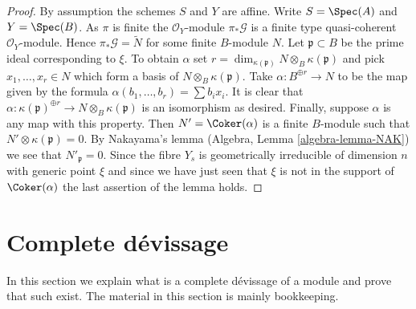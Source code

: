 \begin{proof}
By assumption the schemes $S$ and $Y$ are affine.
Write $S = \Spec(A)$ and $Y = \Spec(B)$.
As $\pi$ is finite the $\mathcal{O}_Y$-module $\pi_*\mathcal{G}$
is a finite type quasi-coherent $\mathcal{O}_Y$-module.
Hence $\pi_*\mathcal{G} = \widetilde{N}$ for some finite $B$-module $N$.
Let $\mathfrak p \subset B$ be the prime ideal corresponding to $\xi$.
To obtain $\alpha$ set
$r = \dim_{\kappa(\mathfrak p)} N \otimes_B \kappa(\mathfrak p)$
and pick $x_1, \ldots, x_r \in N$ which form a basis of
$N \otimes_B \kappa(\mathfrak p)$. Take $\alpha : B^{\oplus r} \to N$
to be the map given by the formula $\alpha(b_1, \ldots, b_r) = \sum b_ix_i$.
It is clear that
$\alpha : \kappa(\mathfrak p)^{\oplus r} \to N \otimes_B \kappa(\mathfrak p)$
is an isomorphism as desired. Finally, suppose $\alpha$ is any map with this
property. Then $N' = \Coker(\alpha)$ is a finite $B$-module
such that $N' \otimes \kappa(\mathfrak p) = 0$. By Nakayama's lemma
(Algebra, Lemma \ref{algebra-lemma-NAK})
we see that $N'_{\mathfrak p} = 0$. Since the fibre $Y_s$ is
geometrically irreducible of dimension $n$ with generic point $\xi$
and since we have just seen that $\xi$ is not in the support of
$\Coker(\alpha)$ the last assertion of the lemma holds.
\end{proof}

\section{Complete d\'evissage}
\label{flat-section-complete-devissage}
In this section we explain what is a complete d\'evissage of a
module and prove that such exist. The material in this
section is mainly bookkeeping.

